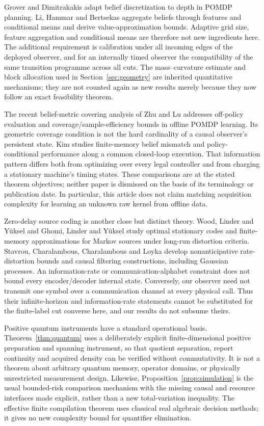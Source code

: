 Grover and Dimitrakakis\cite{grover} adapt belief discretization to depth in POMDP planning. Li, Hammar and Bertsekas\cite{li} aggregate beliefs through features and conditional means and derive value-approximation bounds. Adaptive grid size, feature aggregation and conditional means are therefore not new ingredients here. The additional requirement is calibration under all incoming edges of the deployed observer, and for an internally timed observer the compatibility of the same transition programme across all cuts. The mass--curvature estimate and block allocation used in Section~\ref{sec:geometry} are inherited quantitative mechanisms\cite{prior}; they are not counted again as new results merely because they now follow an exact feasibility theorem.

The recent belief-metric covering analysis of Zhu and Lu\cite{zhu} addresses off-policy evaluation and coverage/sample-efficiency bounds in offline POMDP learning. Its geometric coverage condition is not the hard cardinality of a causal observer's persistent state. Kim\cite{kim} studies finite-memory belief mismatch and policy-conditional performance along a common closed-loop execution. That information pattern differs both from optimizing over every legal controller and from charging a stationary machine's timing states. These comparisons are at the stated theorem objectives; neither paper is dismissed on the basis of its terminology or publication date. In particular, this article does not claim matching acquisition complexity for learning an unknown raw kernel from offline data.

Zero-delay source coding is another close but distinct theory. Wood, Linder and Y\"uksel\cite{wood} and Ghomi, Linder and Y\"uksel\cite{ghomi} study optimal stationary codes and finite-memory approximations for Markov sources under long-run distortion criteria. Stavrou, Charalambous, Charalambous and Loyka\cite{stavrou} develop nonanticipative rate-distortion bounds and causal filtering constructions, including Gaussian processes. An information-rate or communication-alphabet constraint does not bound every encoder/decoder internal state. Conversely, our observer need not transmit one symbol over a communication channel at every physical call. Thus their infinite-horizon and information-rate statements cannot be substituted for the finite-label cut converse here, and our results do not subsume theirs.

Positive quantum instruments have a standard operational basis\cite{davies}. Theorem~\ref{thm:quantum} uses a deliberately explicit finite-dimensional positive preparation and spanning instrument, so that quotient separation, report continuity and acquired density can be verified without commutativity. It is not a theorem about arbitrary quantum memory, operator domains, or physically unrestricted measurement design. Likewise, Proposition~\ref{prop:simulation} is the usual bounded-risk comparison mechanism\cite{lecam} with the missing causal and resource interfaces made explicit, rather than a new total-variation inequality. The effective finite compilation theorem uses classical real algebraic decision methods\cite{bpr}; it gives no new complexity bound for quantifier elimination.


